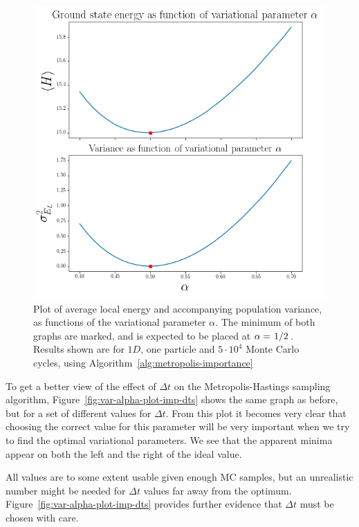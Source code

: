 \documentclass[twocolumn]{article}
\begin{document}
\begin{figure}[ht]
    \centering
    \includegraphics[width=0.9\linewidth]{../results/var-alpha-plot-imp-50000.png}
    \caption{Plot of average local energy and accompanying population variance,
    as functions of the variational parameter $\alpha$. The minimum of both
    graphs are marked, and is expected to be placed at
    $\alpha=\flatfrac{1}{2}$. Results shown are for $1D$, one particle and
    $5\cdot 10^{4}$ Monte Carlo cycles, using
    Algorithm~\ref{alg:metropolis-importance}}
    \label{fig:var-alpha-plot-imp}
\end{figure}


To get a better view of the effect of $\Delta t$ on the Metropolis-Hastings
sampling algorithm, Figure~\ref{fig:var-alpha-plot-imp-dts} shows the same graph
as before, but for a set of different values for $\Delta t$. From this plot it
becomes very clear that choosing the correct value for this parameter will be
very important when we try to find the optimal variational parameters. We see
that the apparent minima appear on both the left and the right of the ideal
value. 

All values are to some extent usable given enough MC samples, but an unrealistic
number might be needed for $\Delta t$ values far away from the optimum.
Figure~\ref{fig:var-alpha-plot-imp-dts} provides further evidence that $\Delta
t$ must be chosen with care.
\end{document}
